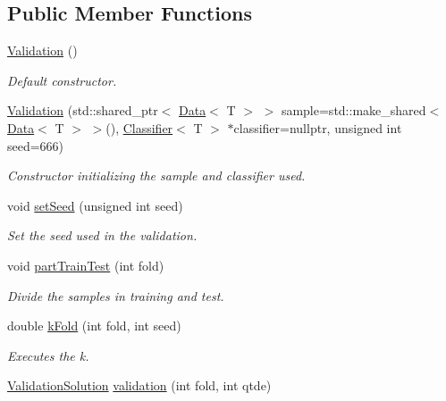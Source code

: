 \subsection*{Public Member Functions}
\begin{DoxyCompactItemize}
\item 
\mbox{\label{class_validation_a8421390022d90bebecf761d23533c72e}} 
\mbox{\hyperlink{class_validation_a8421390022d90bebecf761d23533c72e}{Validation}} ()
\begin{DoxyCompactList}\small\item\em Default constructor. \end{DoxyCompactList}\item 
\mbox{\hyperlink{class_validation_a91399f8b544cb22de02b85618ef5b0cc}{Validation}} (std\+::shared\+\_\+ptr$<$ \mbox{\hyperlink{class_data}{Data}}$<$ T $>$ $>$ sample=std\+::make\+\_\+shared$<$ \mbox{\hyperlink{class_data}{Data}}$<$ T $>$ $>$(), \mbox{\hyperlink{class_classifier}{Classifier}}$<$ T $>$ $\ast$classifier=nullptr, unsigned int seed=666)
\begin{DoxyCompactList}\small\item\em Constructor initializing the sample and classifier used. \end{DoxyCompactList}\item 
void \mbox{\hyperlink{class_validation_a26fec6a8582bded0583a4754cdba0009}{set\+Seed}} (unsigned int seed)
\begin{DoxyCompactList}\small\item\em Set the seed used in the validation. \end{DoxyCompactList}\item 
void \mbox{\hyperlink{class_validation_a1e9580697a164d4bfbe721f2f1589c57}{part\+Train\+Test}} (int fold)
\begin{DoxyCompactList}\small\item\em Divide the samples in training and test. \end{DoxyCompactList}\item 
double \mbox{\hyperlink{class_validation_a1a5825e2dd051a72aaffd423a0df55f1}{k\+Fold}} (int fold, int seed)
\begin{DoxyCompactList}\small\item\em Executes the k. \end{DoxyCompactList}\item 
\mbox{\hyperlink{class_validation_solution}{Validation\+Solution}} \mbox{\hyperlink{class_validation_aa7f79be36229a955f67a29556152f373}{validation}} (int fold, int qtde)

\end{DoxyCompactItemize}
